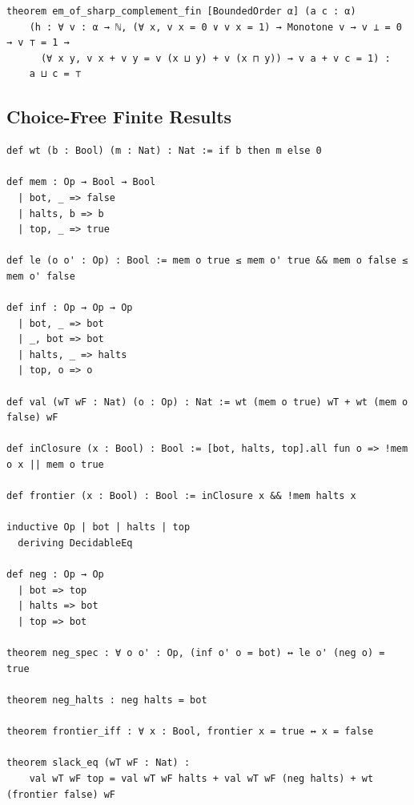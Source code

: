 \label{lean:em-of-sharp-complement-fin}
\begin{lstlisting}
theorem em_of_sharp_complement_fin [BoundedOrder α] (a c : α)
    (h : ∀ v : α → ℕ, (∀ x, v x = 0 ∨ v x = 1) → Monotone v → v ⊥ = 0 → v ⊤ = 1 →
      (∀ x y, v x + v y = v (x ⊔ y) + v (x ⊓ y)) → v a + v c = 1) :
    a ⊔ c = ⊤
\end{lstlisting}

\subsection{Choice-Free Finite Results}

\label{lean:constr-sierpinski}
\begin{lstlisting}
def wt (b : Bool) (m : Nat) : Nat := if b then m else 0

def mem : Op → Bool → Bool
  | bot, _ => false
  | halts, b => b
  | top, _ => true

def le (o o' : Op) : Bool := mem o true ≤ mem o' true && mem o false ≤ mem o' false

def inf : Op → Op → Op
  | bot, _ => bot
  | _, bot => bot
  | halts, _ => halts
  | top, o => o

def val (wT wF : Nat) (o : Op) : Nat := wt (mem o true) wT + wt (mem o false) wF

def inClosure (x : Bool) : Bool := [bot, halts, top].all fun o => !mem o x || mem o true

def frontier (x : Bool) : Bool := inClosure x && !mem halts x

inductive Op | bot | halts | top
  deriving DecidableEq

def neg : Op → Op
  | bot => top
  | halts => bot
  | top => bot

theorem neg_spec : ∀ o o' : Op, (inf o' o = bot) ↔ le o' (neg o) = true

theorem neg_halts : neg halts = bot

theorem frontier_iff : ∀ x : Bool, frontier x = true ↔ x = false

theorem slack_eq (wT wF : Nat) :
    val wT wF top = val wT wF halts + val wT wF (neg halts) + wt (frontier false) wF
\end{lstlisting}

